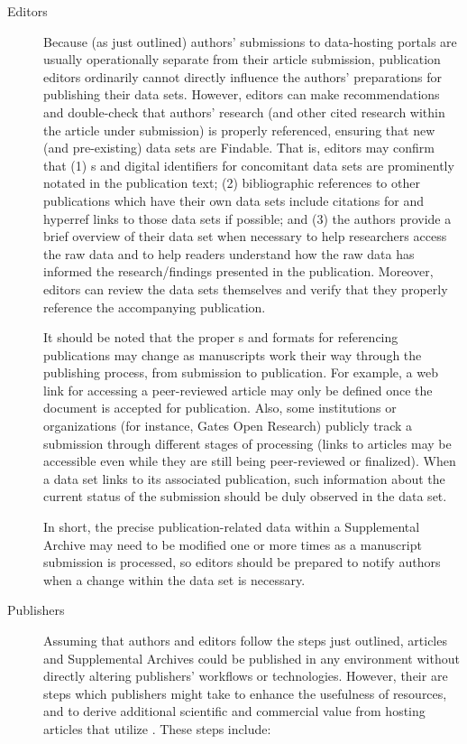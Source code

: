 \documentclass[11pt,letterpaper]{article}
\newcommand{\ATexttclr}[1]{\textcolor{tcolor}{\textbf{#1}}}
\newcommand{\URL}{\resizebox{!}{7pt}{\AcronymText{URL}}}
\newcommand{\textscc}[1]{{\color{orr!35!black}{{%
						\fontfamily{Cabin-TLF}\fontseries{b}\selectfont{\textsc{\scriptsize{#1}}}}}}}
\newcommand{\AcronymText}[1]{{\textscc{#1}}}
\newcommand{\SDRF}{\resizebox{!}{8pt}{\ATexttclr{S}}\resizebox{!}{8pt}{\ATexttclr{DR%
\hspace{1pt}{\raisebox{-1pt}{\fontfamily{qhv}\fontseries{b}\selectfont{}\Large{F}}%
}}}}
\begin{document}
{{\begin{description}
\item[Editors]  Because (as just outlined) authors' submissions 
to data-hosting portals are usually operationally separate 
from their article submission, publication 
editors ordinarily cannot directly influence the authors' 
preparations for publishing their data sets.  However, 
editors can make recommendations and double-check that 
authors' research (and other cited research  
within the article under submission) is properly referenced, ensuring 
that new (and pre-existing) data sets are 
Findable.  That is, editors may confirm that (1) \URL{}s 
and digital identifiers for concomitant data sets are prominently 
notated in the publication text; (2) bibliographic 
references to other publications which have their own 
data sets include citations for and hyperref links to 
those data sets if possible; and (3) the authors provide 
a brief overview of their data set when necessary 
to help researchers access the raw data and to help 
readers understand how the raw data has informed the 
research/findings presented in the publication.  
Moreover, editors can review the data sets themselves 
and verify that they 
properly reference the accompanying publication. 

It should be noted that the proper \URL{}s and formats 
for referencing publications may change as manuscripts 
work their way through the publishing process, from 
submission to publication.  
For example, a web link for accessing a peer-reviewed 
article may only be defined once the document is 
accepted for publication.  Also, some institutions 
or organizations  
(for instance, Gates Open Research) 
publicly track a submission through different stages 
of processing (links to articles may be accessible  
even while they are still being peer-reviewed or finalized).  
When a data set links to its associated 
publication, such information about the current 
status of the submission should be duly observed in the 
data set.

In short, the precise publication-related data within a 
Supplemental Archive may need to be modified one 
or more times as a manuscript submission is processed, 
so editors should be prepared to notify authors when 
a change within the data set is necessary.

\item[Publishers]  Assuming that authors and 
editors follow the steps just outlined, 
articles and Supplemental Archives could be 
published in any environment without directly altering 
publishers' workflows or technologies.  
However, their are steps which publishers 
might take to enhance the usefulness of \SDRF{} 
resources, and to derive additional scientific 
and commercial value from hosting articles 
that utilize \SDRF{}.  These steps include:


\end{description}}}
\end{document}
